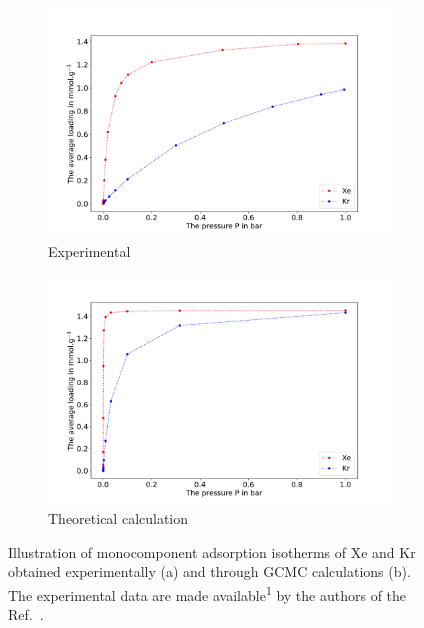 \documentclass[main.tex]{subfiles}
\begin{document}
\begin{figure}[ht]
  \centering
  \begin{subfigure}[b]{0.45\textwidth}
    \centering
    \includegraphics[height=0.7\textwidth]{figures/1-screening/Isotherm_Banerjee.pdf}
    \caption{Experimental}
  \end{subfigure}
  \hfill
  \begin{subfigure}[b]{0.45\textwidth}
    \centering
    \includegraphics[height=0.7\textwidth]{figures/1-screening/Isotherm_KAXQIL_gcmc_uff.pdf}
    \caption{Theoretical calculation}
  \end{subfigure}
  \caption{Illustration of monocomponent adsorption isotherms of Xe and Kr obtained experimentally (a) and through GCMC calculations (b). The experimental data are made available\textsuperscript{1} by the authors of the Ref.~\cite{Banerjee_2016}. }\label{isotherm}
\end{figure}
\end{document}
